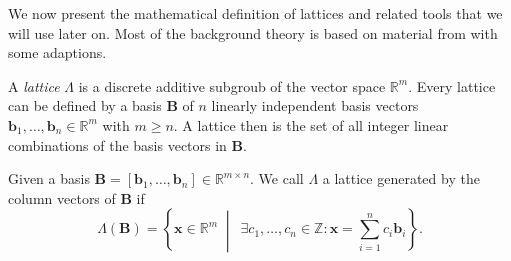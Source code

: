 



We now present the mathematical definition of lattices and related tools that we will use later on. Most of the background theory is based on material from \cite{MG02} with some adaptions.

A \textit{lattice} $\Lambda$ is a discrete additive subgroub of the vector space $\mathbb{R}^m$. Every lattice can be defined by a basis $\mathbf{B}$ of $n$ linearly independent basis vectors $\mathbf{b}_1, \ldots, \mathbf{b}_n \in \mathbb{R}^m$ with $m\geq n$. A lattice then is the set of all integer linear combinations of the basis vectors in $\mathbf{B}$.

\begin{definition}[Lattice]
    Given a basis $\mathbf{B} = \left[\mathbf{b}_1, \ldots, \mathbf{b}_n\right] \in \mathbb{R}^{m\times n}$. We call $\Lambda$ a lattice generated by the column vectors of $\mathbf{B}$ if
    \begin{equation}
        \Lambda(\mathbf{B}) = \left\{ \mathbf{x} \in \mathbb{R}^m \;\middle\vert\ \; \exists c_1, \ldots, c_n \in \mathbb{Z} : \mathbf{x} = \sum_{i=1}^n c_i \mathbf{b}_i \right\}.
    \end{equation}
\end{definition}

